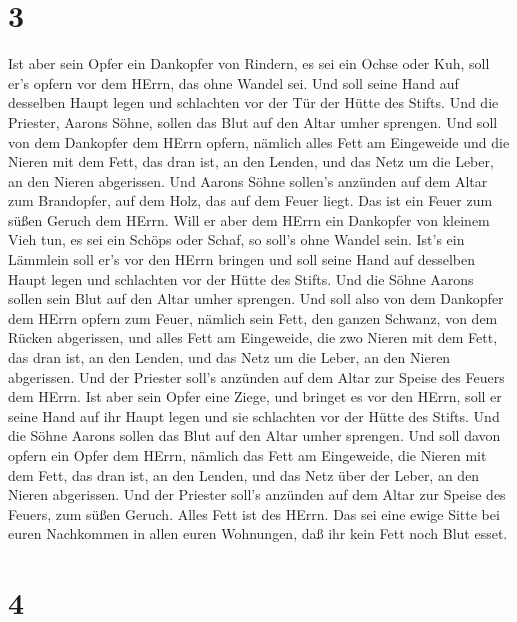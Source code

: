 \hypertarget{section-2}{%
\section{3}\label{section-2}}

 Ist aber sein Opfer ein Dankopfer von Rindern, es sei ein
Ochse oder Kuh, soll er's opfern vor dem HErrn, das ohne Wandel sei.
 Und soll seine Hand auf desselben Haupt legen und
schlachten vor der Tür der Hütte des Stifts. Und die Priester, Aarons
Söhne, sollen das Blut auf den Altar umher sprengen.  Und
soll von dem Dankopfer dem HErrn opfern, nämlich alles Fett am
Eingeweide  und die Nieren mit dem Fett, das dran ist, an
den Lenden, und das Netz um die Leber, an den Nieren abgerissen.
 Und Aarons Söhne sollen's anzünden auf dem Altar zum
Brandopfer, auf dem Holz, das auf dem Feuer liegt. Das ist ein Feuer zum
süßen Geruch dem HErrn.  Will er aber dem HErrn ein
Dankopfer von kleinem Vieh tun, es sei ein Schöps oder Schaf, so soll's
ohne Wandel sein.  Ist's ein Lämmlein soll er's vor den
HErrn bringen  und soll seine Hand auf desselben Haupt legen
und schlachten vor der Hütte des Stifts. Und die Söhne Aarons sollen
sein Blut auf den Altar umher sprengen.  Und soll also von
dem Dankopfer dem HErrn opfern zum Feuer, nämlich sein Fett, den ganzen
Schwanz, von dem Rücken abgerissen, und alles Fett am Eingeweide,
 die zwo Nieren mit dem Fett, das dran ist, an den Lenden,
und das Netz um die Leber, an den Nieren abgerissen.  Und
der Priester soll's anzünden auf dem Altar zur Speise des Feuers dem
HErrn.  Ist aber sein Opfer eine Ziege, und bringet es vor
den HErrn,  soll er seine Hand auf ihr Haupt legen und sie
schlachten vor der Hütte des Stifts. Und die Söhne Aarons sollen das
Blut auf den Altar umher sprengen.  Und soll davon opfern
ein Opfer dem HErrn, nämlich das Fett am Eingeweide,  die
Nieren mit dem Fett, das dran ist, an den Lenden, und das Netz über der
Leber, an den Nieren abgerissen.  Und der Priester soll's
anzünden auf dem Altar zur Speise des Feuers, zum süßen Geruch. Alles
Fett ist des HErrn.  Das sei eine ewige Sitte bei euren
Nachkommen in allen euren Wohnungen, daß ihr kein Fett noch Blut esset.

\hypertarget{section-3}{%
\section{4}\label{section-3}}

